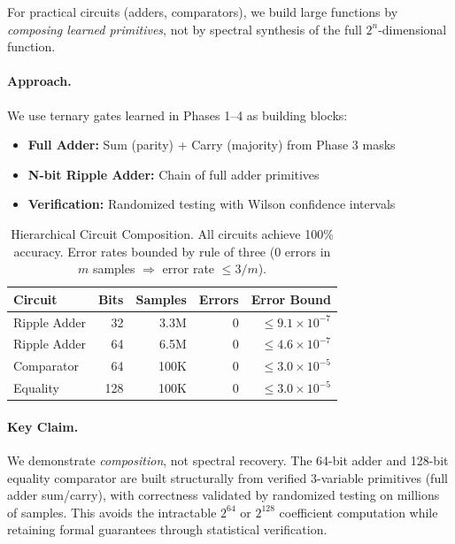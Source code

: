 \documentclass[Royal,times,sageh]{sagej}
\begin{document}
For practical circuits (adders, comparators), we build large functions by \textit{composing learned primitives}, not by spectral synthesis of the full $2^n$-dimensional function.

\paragraph{Approach.} We use ternary gates learned in Phases 1--4 as building blocks:
\begin{itemize}
    \item \textbf{Full Adder:} Sum (parity) + Carry (majority) from Phase 3 masks
    \item \textbf{N-bit Ripple Adder:} Chain of full adder primitives
    \item \textbf{Verification:} Randomized testing with Wilson confidence intervals
\end{itemize}

\begin{table}[h]
\centering
\caption{Hierarchical Circuit Composition. All circuits achieve 100\% accuracy. Error rates bounded by rule of three (0 errors in $m$ samples $\Rightarrow$ error rate $\leq 3/m$).}
\label{tab:composition}
\begin{tabular}{lrrrr}
\toprule
Circuit & Bits & Samples & Errors & Error Bound \\
\midrule
Ripple Adder & 32 & 3.3M & 0 & $\leq 9.1 \times 10^{-7}$ \\
Ripple Adder & 64 & 6.5M & 0 & $\leq 4.6 \times 10^{-7}$ \\
Comparator & 64 & 100K & 0 & $\leq 3.0 \times 10^{-5}$ \\
Equality & 128 & 100K & 0 & $\leq 3.0 \times 10^{-5}$ \\
\bottomrule
\end{tabular}
\end{table}

\paragraph{Key Claim.} We demonstrate \textit{composition}, not spectral recovery. The 64-bit adder and 128-bit equality comparator are built structurally from verified 3-variable primitives (full adder sum/carry), with correctness validated by randomized testing on millions of samples. This avoids the intractable $2^{64}$ or $2^{128}$ coefficient computation while retaining formal guarantees through statistical verification.
\end{document}

